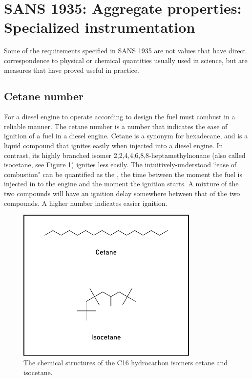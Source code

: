 \section[SANS 1935: Aggregate properties: Specialized in\-stru\-mentation]{SANS
1935: Aggregate properties: \\ Specialized in\-stru\-mentation}

Some of the requirements specified in SANS 1935 are not values that have direct
correspondence to physical or chemical quantities usually used in science, but
are measures that have proved useful in practice.

\subsection{Cetane number}

For a diesel engine to operate according to design the fuel must combust in a
reliable manner. The cetane number is a number that indicates the ease of
ignition of a fuel in a diesel engine. Cetane is a synonym for hexadecane, and
is a liquid compound that ignites easily when injected into a diesel engine. In
contrast, its highly branched isomer 2,2,4,4,6,8,8-heptamethylnonane (also
called isocetane, see Figure \ref{fig:Cetane}) ignites less easily. The
intuitively-understood ``ease of combustion" can be quantified as the
, the time between the moment the fuel is injected in to
the engine and the moment the ignition starts. A mixture of the two compounds
will have an ignition delay somewhere between that of the two compounds. A
higher number indicates easier ignition.

\begin{figure}
\centering
\includegraphics[width=0.8\textwidth]{Figures/cetane.pdf}
\decoRule

\caption[Cetane and isocetane]{The chemical structures of the C16 hydrocarbon
isomers cetane and isocetane.}
\label{fig:Cetane}
\end{figure}

